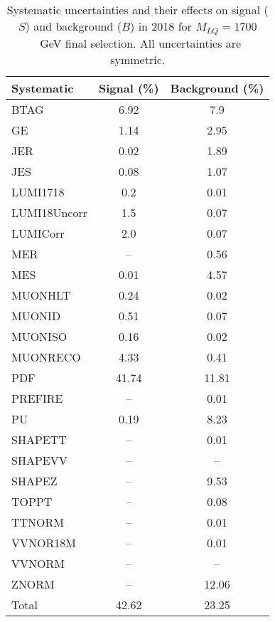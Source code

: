 \begin{table}[htbp]
\begin{center}
\caption{Systematic uncertainties and their effects on signal ($S$) and background ($B$) in 2018 for $M_{LQ}=1700$~GeV final selection. All uncertainties are symmetric.}
\begin{tabular}{lcc}
\hline\hline
Systematic & Signal (\%) & Background (\%) \\ \hline 
BTAG & 6.92 & 7.9\\ 
GE & 1.14 & 2.95\\ 
JER & 0.02 & 1.89\\ 
JES & 0.08 & 1.07\\ 
LUMI1718 & 0.2 & 0.01\\ 
LUMI18Uncorr & 1.5 & 0.07\\ 
LUMICorr & 2.0 & 0.07\\ 
MER & -- & 0.56\\ 
MES & 0.01 & 4.57\\ 
MUONHLT & 0.24 & 0.02\\ 
MUONID & 0.51 & 0.07\\ 
MUONISO & 0.16 & 0.02\\ 
MUONRECO & 4.33 & 0.41\\ 
PDF & 41.74 & 11.81\\ 
PREFIRE & -- & 0.01\\ 
PU & 0.19 & 8.23\\ 
SHAPETT & -- & 0.01\\ 
SHAPEVV & -- & --\\ 
SHAPEZ & -- & 9.53\\ 
TOPPT & -- & 0.08\\ 
TTNORM & -- & 0.01\\ 
VVNOR18M & -- & 0.01\\ 
VVNORM & -- & --\\ 
ZNORM & -- & 12.06\\ 
Total & 42.62 & 23.25\\ \hline \hline
\end{tabular}
\label{tab:SysUncertainties_uujj_1700}
\end{center}
\end{table}

